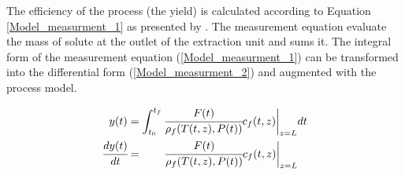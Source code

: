 \documentclass[../Article_Model_Parameters.tex]{subfiles}
\begin{document}
		The efficiency of the process (the yield) is calculated according to Equation \ref{Model_measurment_1} as presented by \citet{Sovova1994a}. The measurement equation evaluate the mass of solute at the outlet of the extraction unit and sums it. The integral form of the measurement equation (\ref{Model_measurment_1}) can be transformed into the differential form (\ref{Model_measurment_2}) and augmented with the process model.
			
		{\footnotesize
			\begin{align} 
				\label{Model_measurment_1}
				{\color{black}y}(t) &= \int_{t_0}^{t_f} \cfrac{{\color{black}F}(t)}{{\color{black}\rho_f}({\color{black}T}(t,z),{\color{black}P}(t))} {\color{black}c_f}(t,z) \biggr\rvert_{z=L} dt \\
				\cfrac{d{\color{black}y}(t)}{dt} &= \qquad \cfrac{{\color{black}F}(t)}{{\color{black}\rho_f}({\color{black}T}(t,z),{\color{black}P}(t))} {\color{black}c_f}(t,z) \biggr\rvert_{z=L} 
                \label{Model_measurment_2}
		\end{align}	}
  
\end{document}
